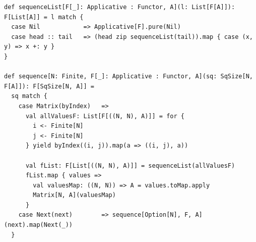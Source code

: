 \begin{lstlisting}[frame=single,fillcolor={\color{black}},framesep={0.2mm},framexleftmargin=2mm,framexrightmargin=2mm,framextopmargin=2mm,framexbottommargin=2mm]
def sequenceList[F[_]: Applicative : Functor, A](l: List[F[A]]): F[List[A]] = l match {
  case Nil            => Applicative[F].pure(Nil)
  case head :: tail   => (head zip sequenceList(tail)).map { case (x, y) => x +: y }
}

def sequence[N: Finite, F[_]: Applicative : Functor, A](sq: SqSize[N, F[A]]): F[SqSize[N, A]] =
  sq match {
    case Matrix(byIndex)   =>
      val allValuesF: List[F[((N, N), A)]] = for {
        i <- Finite[N]
        j <- Finite[N]
      } yield byIndex((i, j)).map(a => ((i, j), a))

      val fList: F[List[((N, N), A)]] = sequenceList(allValuesF)
      fList.map { values =>
        val valuesMap: ((N, N)) => A = values.toMap.apply
        Matrix[N, A](valuesMap)
      }
    case Next(next)        => sequence[Option[N], F, A](next).map(Next(_))
  }
\end{lstlisting}

